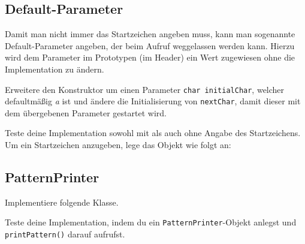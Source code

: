 \subsection{Default-Parameter}
Damit man nicht immer das Startzeichen angeben muss, kann man sogenannte Default-Parameter angeben, der beim Aufruf weggelassen werden kann.
Hierzu wird dem Parameter im Prototypen (im Header) ein Wert zugewiesen ohne die Implementation zu ändern.



Erweitere den Konstruktor um einen Parameter \lstinline{char initialChar}, welcher defaultmäßig \emph{a} ist und ändere die Initialisierung von \lstinline{nextChar}, damit dieser mit dem übergebenen Parameter gestartet wird.

Teste deine Implementation sowohl mit als auch ohne Angabe des Startzeichens.
Um ein Startzeichen anzugeben, lege das Objekt wie folgt an:




\subsection{PatternPrinter}
Implementiere folgende Klasse.



Teste deine Implementation, indem du ein \lstinline{PatternPrinter}-Objekt anlegst und \lstinline{printPattern()} darauf aufrufst.

